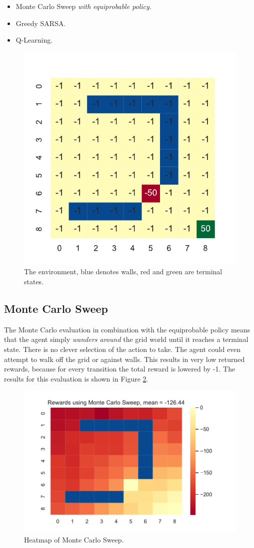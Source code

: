 \documentclass[]{scrartcl}
\begin{document}
\begin{itemize}
	\item Monte Carlo Sweep \textit{with equiprobable policy.}
	\item Greedy SARSA.
	\item Q-Learning.
\end{itemize}

\begin{figure}[H]
	\centering
	\includegraphics[width=0.4\linewidth]{3-0.pdf}
	\caption{The environment, blue denotes walls, red and green are terminal states.}
	\label{fig:3-0}
\end{figure}

\subsection{Monte Carlo Sweep}

The Monte Carlo evaluation in combination with the equiprobable policy means that the agent simply \textit{wanders around} the grid world until it reaches a terminal state. There is no clever selection of the action to take. The agent could even attempt to walk off the grid or against walls. This results in very low returned rewards, because for every transition the total reward is lowered by -1. The results for this evaluation is shown in Figure \ref{fig:3-1}.

\begin{figure}[H]
	\centering
	\includegraphics[width=0.5\linewidth]{3-1.pdf}
	\caption{Heatmap of Monte Carlo Sweep.}
	\label{fig:3-1}
\end{figure}
\end{document}
